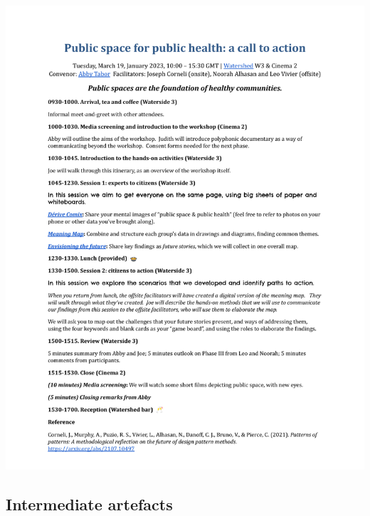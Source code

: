 \documentclass[acmlarge,timestamp]{acmart}
\begin{document}
\begin{mdframed}[backgroundcolor=blue!50,linecolor=blue!50]
  \noindent\includegraphics[width=\textwidth,trim={1cm 3.2cm 1cm 4.5cm},clip=true]{bristol}
\end{mdframed}

\subsection{Intermediate artefacts}
\end{document}
